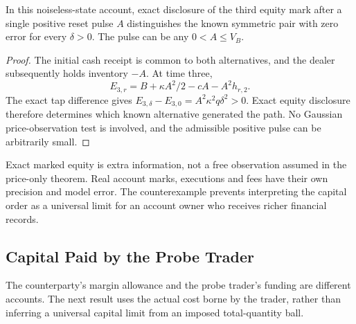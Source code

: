 \documentclass[11pt]{article}
\begin{document}
\begin{proposition}
\label{prop:equity_disclosure}
In this noiseless-state account, exact disclosure of the third equity mark after a single positive reset pulse $A$ distinguishes the known symmetric pair with zero error for every $\delta>0$. The pulse can be any $0<A\le V_B$.
\end{proposition}
\begin{proof}
The initial cash receipt is common to both alternatives, and the dealer subsequently holds inventory $-A$. At time three,
\[E_{3,r}=B+\kappa A^2/2-cA-A^2h_{r,2}.\]
The exact tap difference gives $E_{3,\delta}-E_{3,0}=A^2\kappa^2q\delta^2>0$. Exact equity disclosure therefore determines which known alternative generated the path. No Gaussian price-observation test is involved, and the admissible positive pulse can be arbitrarily small.
\end{proof}
Exact marked equity is extra information, not a free observation assumed in the price-only theorem. Real account marks, executions and fees have their own precision and model error. The counterexample prevents interpreting the capital order as a universal limit for an account owner who receives richer financial records.


\subsection{Capital Paid by the Probe Trader}
\label{sec:trader_capital}
The counterparty's margin allowance and the probe trader's funding are different accounts. The next result uses the actual cost borne by the trader, rather than inferring a universal capital limit from an imposed total-quantity ball.
\end{document}
